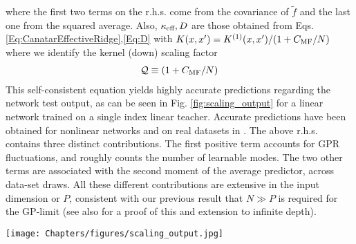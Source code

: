 where the first two terms on the r.h.s. come from the covariance of $\tilde{f}$ and the last one from the squared average. Also, $\kappa_{\text{eff}},D$ are those obtained from Eqs. \ref{Eq:CanatarEffectiveRidge},\ref{Eq:D} with $K(x,x')=K^{(1)}(x,x')/(1+C_{\text{MF}}/N)$ where we identify the kernel (down) scaling factor 
\begin{align}
{\cal Q}\equiv (1+C_{\text{MF}}/N)
\end{align}
This self-consistent equation yields highly accurate predictions regarding the network test output, as can be seen in Fig. \ref{fig:scaling_output} for a linear network trained on a single index linear teacher. Accurate predictions have been obtained for nonlinear networks and on real datasets in \cite{RotondoFCN2}.  The above r.h.s. contains three distinct contributions. The first positive term accounts for GPR fluctuations, and roughly counts the number of learnable modes. The two other terms are associated with the second moment of the average predictor, across data-set draws. All these different contributions are extensive in the input dimension or $P$, consistent with our previous result that $N \gg P$ is required for the GP-limit (see also \cite{Hanin2023} for a proof of this and extension to infinite depth). 

\begin{figure*}[t]
\vskip -0.2in
\begin{centering}
\texttt{[image: Chapters/figures/scaling\_output.jpg]}\vskip -0.1in\caption{Here we consider a single hidden layer linear network trained on a linear single index target, and compare the theoretical predictions of the kernel scaling approximation for the network output, as well those of the NNGP. We study two measures for the network output: (a) Learnability which we define as $\frac{f\cdot  y}{ y \cdot y},$ which corresponds to the proportion of the target learned by the network, as well as (b) mean squared test error. Network Parameters:
$d=50,N=1000$, each experimental point corresponds to an ensemble of $\sim$30 networks trained on different data seeds. Each network was trained until there was no visible change to the learnability, loss or hidden layer weight variance.}
\label{fig:scaling_output}
\par\end{centering}
\vskip -0.2in
\end{figure*}

